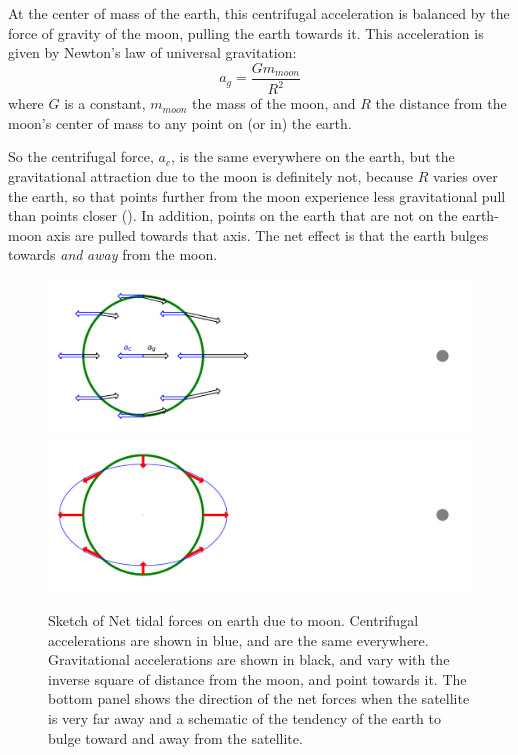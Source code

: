 At the center of mass of the earth, this centrifugal acceleration is balanced by the force of gravity of the moon, pulling the earth towards it.  This acceleration is given by Newton's law of universal gravitation:
\begin{equation}
  a_g = \frac{G m_{moon}}{R^2}
\end{equation}
where $G$ is a constant, $m_{moon}$ the mass of the moon, and $R$ the distance from the moon's center of mass to any point on (or in) the earth. 

So the centrifugal force, $a_c$, is the same everywhere on the earth, but the gravitational attraction due to the moon is definitely not, because $R$ varies over the earth, so that points further from the moon experience less gravitational pull than points closer ().  In addition, points on the earth that are not on the earth-moon axis are pulled towards that axis.  The net effect is that the earth bulges towards \emph{and} \emph{away} from the moon.  

\begin{figure}[hbtp]
  \begin{center}
    \includegraphics[]{figs/Waves/TidalForces0}
    \includegraphics[]{figs/Waves/TidalForces}
    \caption{Sketch of Net tidal forces on earth due to moon. Centrifugal accelerations are shown in blue, and are the same everywhere.  Gravitational accelerations are shown in black, and vary with the inverse square of distance from the moon, and point towards it.  The bottom panel shows the direction of the net forces when the satellite is very far away and a schematic of the tendency of the earth to bulge toward and away from the satellite.   }
    \label{fig:TidalForces}
  \end{center}
\end{figure}

